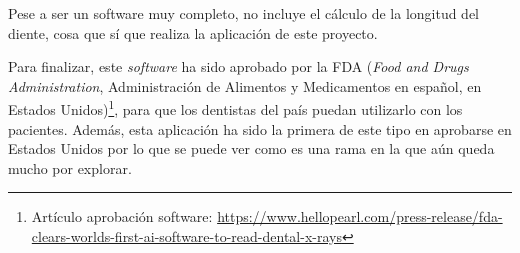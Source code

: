 Pese a ser un software muy completo, no incluye el cálculo de la longitud del diente, cosa que sí que realiza la aplicación de este proyecto.

Para finalizar, este \emph{software} ha sido aprobado por la FDA (\emph{Food and Drugs Administration}, Administración de Alimentos y Medicamentos en español, en Estados Unidos)\footnote{Artículo aprobación software: \url{https://www.hellopearl.com/press-release/fda-clears-worlds-first-ai-software-to-read-dental-x-rays}}, para que los dentistas del país puedan utilizarlo con los pacientes. Además, esta aplicación ha sido la primera de este tipo en aprobarse en Estados Unidos por lo que se puede ver como es una rama en la que aún queda mucho por explorar.